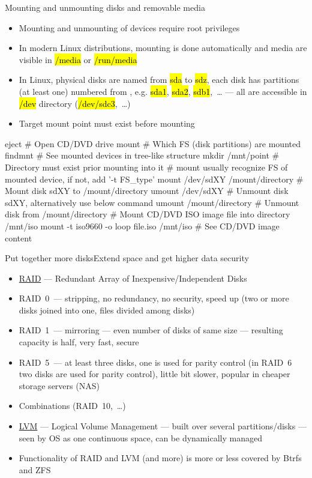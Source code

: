 \documentclass[compress, ucs, xelatex, 11pt, xcolor=svgnames, aspectratio=169,
	hyperref={
		bookmarks=true,
		unicode=true,
		colorlinks=true,
		pdftitle={Linux, command line and MetaCentrum},
		plainpages=false,
		pdfauthor={Vojtech Zeisek},
		pdfsubject={Course about use of Linux command line, writing shell scripts and using MetaCentrum of CESNET},
		pdfcreator={XeLaTeX},
		pdfkeywords={Linux, GNU, BASH, shell, command line, MetaCentrum},
		linkcolor=DarkRed, %
		anchorcolor=DarkBlue, %
		citecolor=Indigo, %
		filecolor=NavyBlue, %
		menucolor=DarkMagenta, %
		urlcolor=DarkBlue, %
		pdftex},
	url={hyphens, lowtilde} %
	]{beamer}
\renewcommand{\texttt}[1]{\hl{\ttfamily #1}}
\begin{document}
\begin{frame}[fragile]{Mounting and unmounting disks and removable media}
	\begin{itemize}
		\item Mounting and unmounting of devices require root privileges
		\item In modern Linux distributions, mounting is done automatically and media are visible in \texttt{/media} or \texttt{/run/media}
		\item In Linux, physical disks are named from \texttt{sda} to \texttt{sdz}, each disk has partitions (at least one) numbered from \texttt{1}, e.g. \texttt{sda1}, \texttt{sda2}, \texttt{sdb1},~\ldots{ }--- all are accessible in \texttt{/dev} directory (\texttt{/dev/sdc3},~\ldots)
		\item Target mount point must exist before mounting
	\end{itemize}
	\begin{bashcode}
    eject # Open CD/DVD drive
    mount # Which FS (disk partitions) are mounted
    findmnt # See mounted devices in tree-like structure
    mkdir /mnt/point # Directory must exist prior mounting into it
    # mount usually recognize FS of mounted device, if not, add '-t FS_type'
    mount /dev/sdXY /mount/directory # Mount disk sdXY to /mount/directory
    umount /dev/sdXY # Unmount disk sdXY, alternatively use below command
    umount /mount/directory # Unmount disk from /mount/directory
    # Mount CD/DVD ISO image file into directory /mnt/iso
    mount -t iso9660 -o loop file.iso /mnt/iso # See CD/DVD image content
	\end{bashcode}
\end{frame}

\begin{frame}{Put together more disks}{Extend space and get higher data security}
	\label{LVMRAID}
	\begin{itemize}
		\item \href{https://en.wikipedia.org/wiki/RAID}{RAID} --- Redundant Array of Inexpensive/Independent Disks
		\item RAID~0~--- stripping, no redundancy, no security, speed up (two or more disks joined into one, files divided among disks)
		\item RAID~1~--- mirroring --- even number of disks of same size --- resulting capacity is half, very fast, secure
		\item RAID~5~--- at least three disks, one is used for parity control (in RAID~6 two disks are used for parity control), little bit slower, popular in cheaper storage servers (NAS)
		\item Combinations (RAID~10,~\ldots)
		\item \href{https://en.wikipedia.org/wiki/Logical_volume_management}{LVM} --- Logical Volume Management --- built over several partitions/disks --- seen by OS as one continuous space, can be dynamically managed
		\item Functionality of RAID and LVM (and more) is more or less covered by Btrfs and ZFS
	\end{itemize}
\end{frame}
\end{document}
